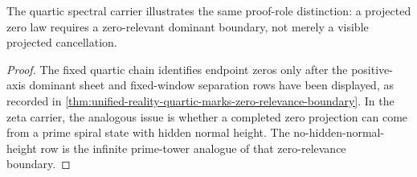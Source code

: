 \begin{corollary}
\label{cor:unified-reality-quartic-dominance-finite-analogue}
The quartic spectral carrier illustrates the same proof-role distinction:
a projected zero law requires a zero-relevant dominant boundary, not
merely a visible projected cancellation.
\end{corollary}

\begin{proof}
The fixed quartic chain identifies endpoint zeros only after the
positive-axis dominant sheet and fixed-window separation rows have been
displayed, as recorded in
\autoref{thm:unified-reality-quartic-marks-zero-relevance-boundary}.  In
the zeta carrier, the analogous issue is whether a completed zero
projection can come from a prime spiral state with hidden normal height.
The no-hidden-normal-height row is the infinite prime-tower analogue of
that zero-relevance boundary.
\end{proof}
